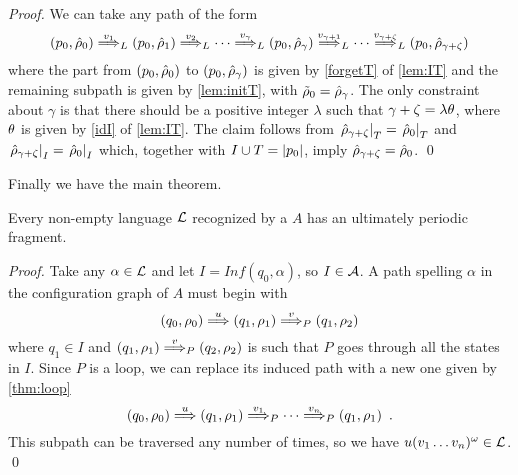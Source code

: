 \begin{proof}
We can take any path of the form
\[
	(p_0,\hat{\rho}_0) \overset{v_1}{\Longrightarrow}_{L} (p_0,\hat{\rho}_1) \overset{v_2}{\Longrightarrow}_{L} \cdots \overset{v_{\gamma}}{\Longrightarrow}_{L} (p_0,\hat{\rho}_\gamma) \overset{v_{\gamma+1}}{\Longrightarrow}_{L} \cdots \overset{v_{\gamma + \zeta}}{\Longrightarrow}_{L} (p_0,\hat{\rho}_{\gamma + 
	 \zeta})
\]
where the part from $(p_0,\hat{\rho}_0)$ to $(p_0,\hat{\rho}_\gamma)$ is given by \eqref{forgetT} of \cref{lem:IT} and the remaining subpath is given by \cref{lem:initT}, with $\tilde{\rho}_0 = \hat{\rho}_\gamma$. The only constraint about $\gamma$ is that there should be a positive integer $\lambda$ such that $\gamma + \zeta = \lambda \theta$, where $\theta$ is given by \eqref{idI} of \cref{lem:IT}. The claim follows from $\left.\hat{\rho}_{\gamma + \zeta}\right|_{T} = \left.\hat{\rho}_0\right|_{T}$ and 
$\left.\hat{\rho}_{\gamma + \zeta}\right|_{I} = \left.\hat{\rho}_0\right|_{I}$ which, together with $I \cup T = |p_0|$, imply $\hat{\rho}_{\gamma + \zeta} = \hat{\rho}_0$.
\qed
\end{proof}
%
Finally we have the main theorem.
%
\begin{theorem}
Every non-empty language $\mathcal{L}$ recognized by a \hdma{} $A$ has an ultimately periodic fragment.
\end{theorem}
\begin{proof}
Take any $\alpha \in \mathcal{L}$ and let $I = Inf(q_0,\alpha)$, so $I \in \mathcal{A}$. A path spelling $\alpha$ in the configuration graph of $A$ must  begin with
\[
	(q_0,\rho_0) \overset{u}{\Longrightarrow} (q_1,\rho_1) \overset{v}{\Longrightarrow}_{P} (q_1,\rho_2)
\]
where $q_1 \in I$ and $(q_1,\rho_1) \overset{v}{\Longrightarrow}_{P} (q_2,\rho_2)$ is such that $P$ goes through all the states in $I$. Since $P$ is a loop, we can replace its induced path with a new one given by \cref{thm:loop} 
\[
	(q_0,\rho_0) \overset{u}{\Longrightarrow} (q_1,\rho_1) \overset{v_1}{\Longrightarrow}_{P} \cdots \overset{v_n}{\Longrightarrow}_{P} (q_1,\rho_1) \enspace .
\]
This subpath can be traversed any number of times, so we have $u(v_1\dots v_n)^\omega \in \mathcal{L}$.
\qed
\end{proof}

